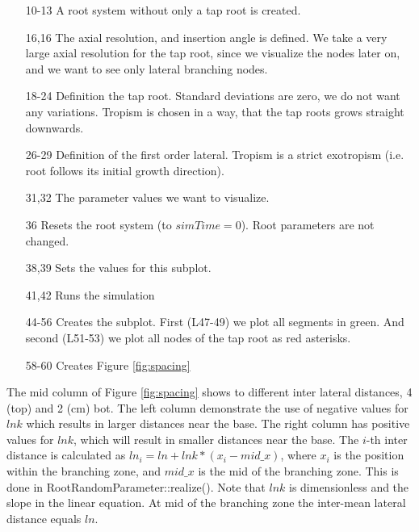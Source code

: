 

\begin{itemize}
\item[10-13] A root system without only a tap root is created. 
\item[16,16] The axial resolution, and insertion angle is defined. We take a very large axial resolution for the tap root, since we visualize the nodes later on, and we want to see only lateral branching nodes.
\item[18-24] Definition the tap root. Standard deviations are zero, we do not want any variations. Tropism is chosen in a way, that the tap roots grows straight downwards.
\item[26-29] Definition of the first order lateral. Tropism is a strict exotropism (i.e. root follows its initial growth direction).
\item[31,32] The parameter values we want to visualize.
\item[36] Resets the root system (to $simTime = 0$). Root parameters are not changed. 
\item[38,39] Sets the values for this subplot. 
\item[41,42] Runs the simulation
\item[44-56] Creates the subplot. First (L47-49) we plot all segments in green. And second (L51-53) we plot all nodes of the tap root as red asterisks.
\item[58-60] Creates Figure \ref{fig:spacing}
\end{itemize}

The mid column of Figure \ref{fig:spacing} shows to different inter lateral distances, 4 (top) and 2 (cm) bot. The left column demonstrate the use of negative values for $lnk$ which results in larger distances near the base. The right column has positive values for $lnk$, which will result in smaller distances near the base. The $i$-th inter distance is calculated as $ln_i = ln + lnk*(x_i-mid\_x)$, where $x_i$ is the position within the branching zone, and $mid\_x$ is the mid of the branching zone. This is done in RootRandomParameter::realize(). Note that $lnk$ is dimensionless and the slope in the linear equation. At mid of the branching zone the inter-mean lateral distance equals $ln$. 


